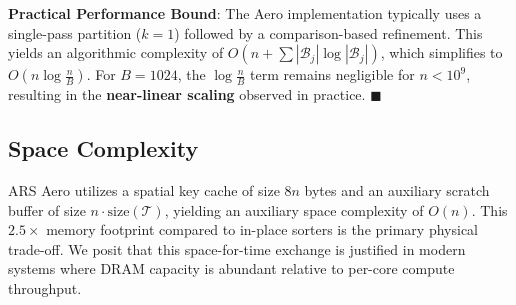 \textbf{Practical Performance Bound}: The Aero implementation typically uses a single-pass partition ($k=1$) followed by a comparison-based refinement. This yields an algorithmic complexity of $O(n + \sum |\mathcal{B}_j| \log |\mathcal{B}_j|)$, which simplifies to $O(n \log \frac{n}{B})$. For $B=1024$, the $\log \frac{n}{B}$ term remains negligible for $n < 10^9$, resulting in the \textbf{near-linear scaling} observed in practice. $\blacksquare$

\subsection{Space Complexity}
ARS Aero utilizes a spatial key cache of size $8n$ bytes and an auxiliary scratch buffer of size $n \cdot \text{size}(\mathcal{T})$, yielding an auxiliary space complexity of $O(n)$. This $2.5\times$ memory footprint compared to in-place sorters is the primary physical trade-off. We posit that this space-for-time exchange is justified in modern systems where DRAM capacity is abundant relative to per-core compute throughput.
